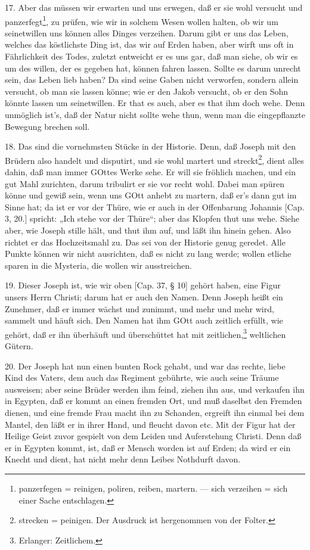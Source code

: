 17. Aber das müssen wir erwarten und uns erwegen, daß er sie wohl versucht und panzerfegt\footnote{panzerfegen = reinigen, poliren, reiben, martern. — sich verzeihen = sich einer Sache entschlagen.}, zu prüfen, wie wir in solchem Wesen wollen halten, ob wir um seinetwillen uns können alles Dinges verzeihen. Darum gibt er uns das Leben, welches das köstlichste Ding ist, das wir auf Erden haben, aber wirft uns oft in Fährlichkeit des Todes, zuletzt entweicht er es uns gar, daß man siehe, ob wir es um des willen, der es gegeben hat, können fahren lassen. Sollte es darum unrecht sein, das Leben lieb haben? Da sind seine Gaben nicht verworfen, sondern allein versucht, ob man sie lassen könne; wie er den Jakob versucht, ob er den Sohn könnte lassen um seinetwillen. Er that es auch, aber es that ihm doch wehe. Denn unmöglich ist’s, daß der Natur nicht sollte wehe thun, wenn man die eingepflanzte Bewegung brechen soll.

18. Das sind die vornehmsten Stücke in der Historie. Denn, daß Joseph mit den Brüdern also handelt und disputirt, und sie wohl martert und streckt\footnote{strecken = peinigen. Der Ausdruck ist hergenommen von der Folter.}, dient alles dahin, daß man immer GOttes Werke sehe. Er will sie fröhlich machen,
und ein gut Mahl zurichten, darum tribulirt er sie vor recht wohl. Dabei man spüren könne und gewiß sein, wenn uns GOtt anhebt zu martern, daß er’s dann gut im Sinne hat; da ist er vor der Thüre, wie er auch in der Offenbarung Johannis [Cap. 3, 20.] spricht: „Ich stehe vor der Thüre“; aber das Klopfen thut uns wehe. Siehe aber, wie Joseph stille hält, und thut ihm auf, und läßt ihn hinein gehen. Also richtet er das Hochzeitsmahl zu. Das sei von der Historie genug geredet. Alle Punkte können wir nicht ausrichten, daß es nicht zu lang werde; wollen etliche sparen in die Mysteria, die wollen wir ausstreichen.

19. Dieser Joseph ist, wie wir oben [Cap. 37, § 10] gehört haben, eine Figur unsers Herrn Christi; darum hat er auch den Namen. Denn Joseph heißt ein Zunehmer, daß er immer wächst und zunimmt, und mehr und mehr wird, sammelt und häuft sich. Den Namen hat ihm GOtt auch zeitlich erfüllt, wie gehört, daß er ihn überhäuft und überschüttet hat mit zeitlichen,\footnote{Erlanger: Zeitlichem.} weltlichen Gütern.

20. Der Joseph hat nun einen bunten Rock gehabt, und war das rechte, liebe Kind des Vaters, dem auch das Regiment gebührte, wie auch seine Träume ausweisen; aber seine Brüder werden ihm feind, ziehen ihn aus, und verkaufen ihn in Egypten, daß er kommt an einen fremden Ort, und muß daselbst den Fremden dienen, und eine fremde Frau macht ihn zu Schanden, ergreift ihn einmal bei dem Mantel, den läßt er in ihrer Hand, und fleucht davon etc. Mit der Figur hat der Heilige Geist zuvor gespielt von dem Leiden und Auferstehung Christi. Denn daß er in Egypten kommt, ist, daß er Mensch worden ist auf Erden; da wird er ein Knecht und dient, hat nicht mehr denn Leibes Nothdurft davon.

